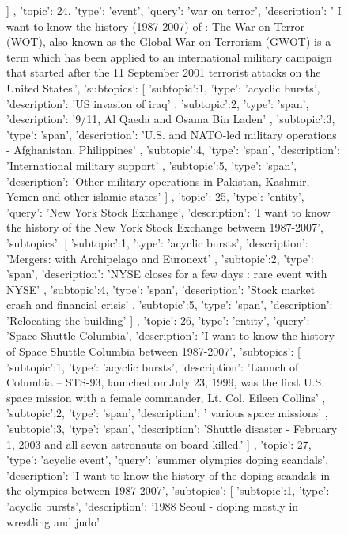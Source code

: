 \begin{figure}[ht]
{\begin{minipage}{\textwidth}
{{			}	
		]
	},
	{		
		'topic': 24,
		'type': 'event',
		'query': 'war on terror',
		'description': ' I want to know the history (1987-2007) of : The War on Terror (WOT), also known as the Global War on Terrorism (GWOT) is a term which has been applied to an international military campaign that started after the 11 September 2001 terrorist attacks on the United States.',
		'subtopics': [
			{
				'subtopic':1,
				'type': 'acyclic bursts',
				'description': 'US invasion of iraq'
			},
			{
				'subtopic':2,
				'type': 'span',
				'description': '9/11, Al Qaeda and Osama Bin Laden'
			},
			{
				'subtopic':3,
				'type': 'span',
				'description': 'U.S. and NATO-led military operations - Afghanistan, Philippines'
			},
			{
				'subtopic':4,
				'type': 'span',
				'description': 'International military support'
			},
			{
				'subtopic':5,
				'type': 'span',
				'description': 'Other military operations in Pakistan, Kashmir, Yemen and other islamic states'
			}	
		]
	},
	{		
		'topic': 25,
		'type': 'entity',
		'query': 'New York Stock Exchange',
		'description': 'I want to know the history of the New York Stock Exchange between 1987-2007',
		'subtopics': [
			{
				'subtopic':1,
				'type': 'acyclic bursts',
				'description': 'Mergers:  with Archipelago and Euronext' 
			},
			{
				'subtopic':2,
				'type': 'span',
				'description': 'NYSE closes for a few days : rare event with NYSE'
			},
			{
				'subtopic':4,
				'type': 'span',
				'description': 'Stock market crash and financial crisis'
			},
			{
				'subtopic':5,
				'type': 'span',
				'description': 'Relocating the building'
			}
		]
	},
	{		
		'topic': 26,
		'type': 'entity',
		'query': 'Space Shuttle Columbia',
		'description': 'I want to know the history of Space Shuttle Columbia between 1987-2007',
		'subtopics': [
			{
				'subtopic':1,
				'type': 'acyclic bursts',
				'description': 'Launch of Columbia -- STS-93, launched on July 23, 1999, was the first U.S. space mission with a female commander, Lt. Col. Eileen Collins'
			},
			{
				'subtopic':2,
				'type': 'span',
				'description': ' various space missions'
			},
			{
				'subtopic':3,
				'type': 'span',
				'description': 'Shuttle disaster - February 1, 2003 and all seven astronauts on board killed.'
			}	
		]
	},
	{		
		'topic': 27,
		'type': 'acyclic event',
		'query': 'summer olympics doping scandals',
		'description': 'I want to know the history of the doping scandals in the olympics between 1987-2007',
		'subtopics': [
			{
				'subtopic':1,
				'type': 'acyclic bursts',
				'description': '1988 Seoul - doping mostly in wrestling and judo'
}}
\end{minipage}}
\end{figure}
